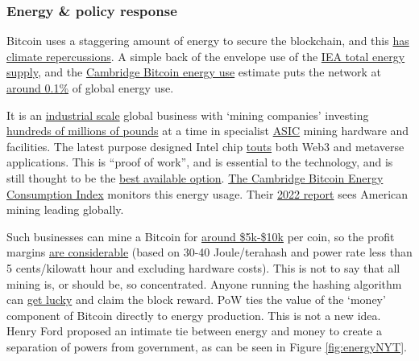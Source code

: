 \subsubsection{Energy \& policy response}
Bitcoin uses a staggering amount of energy to secure the blockchain, and this \href{https://www.edmundconway.com/bitcoin-money-and-the-planet/}{has climate repercussions}. A simple back of the envelope use of the \href{https://www.iea.org/reports/key-world-energy-statistics-2021/supply}{IEA total energy supply}, and the \href{https://ccaf.io/cbeci/index}{Cambridge Bitcoin energy use} estimate puts the network at \href{https://www.wolframalpha.com/input?i=153+terawatt+hours+as+percentage+of+\%28600+exa+joules+as+terrawatt+hours\%29+}{around 0.1\%} of global energy use.\par
It is an \href{https://www.ruetir.com/2022/03/18/riot-whinstone-the-bitcoin-farm-with-100000-computers-that-uses-excess-energy-from-an-oil-platform-to-mine-cryptocurrencies-ruetir/}{industrial scale} global business with `mining companies' investing \href{https://ir.marathondh.com/news-events/press-releases/detail/1272/marathon-digital-holdings-bitcoin-mining-fleet-to-reach}{hundreds of millions of pounds} at a time in specialist \href{https://en.wikipedia.org/wiki/Application-specific_integrated_circuit}{ASIC} mining hardware and facilities. The latest purpose designed Intel chip \href{https://www.intel.com/content/www/us/en/newsroom/opinion/thoughts-blockchain-custom-compute-group.html#gs.pd9ofu}{touts} both Web3 and metaverse applications. This is ``proof of work'',  and is essential to the technology, and is still thought to be the \href{https://www.truthcoin.info/blog/pow-cheapest/}{best available option}. \href{https://ccaf.io/cbeci/index}{The Cambridge Bitcoin Energy Consumption Index} monitors this energy usage. Their \href{https://www.jbs.cam.ac.uk/insight/2022/bitcoin-mining-new-data-reveal-a-surprising-resurgence/}{2022 report} sees American mining leading globally.\par
Such businesses can mine a Bitcoin for \href{https://www.911metallurgist.com/blog/the-cost-to-mine-different-cryptocurrencies-in-every-country}{around \$5k-\$10k} per coin, so the profit margins \href{https://www.nicehash.com/profitability-calculator}{are considerable} (based on 30-40 Joule/terahash and power rate less than 5 cents/kilowatt hour and excluding hardware costs). This is not to say that all mining is, or should be, so concentrated. Anyone running the hashing algorithm can \href{https://twitter.com/ckpooldev/status/1485585814419812356}{get lucky} and claim the block reward. PoW ties the value of the `money' component of Bitcoin directly to energy production. This is not a new idea. Henry Ford proposed an intimate tie between energy and money to create a separation of powers from government, as can be seen in Figure \ref{fig:energyNYT}.\
